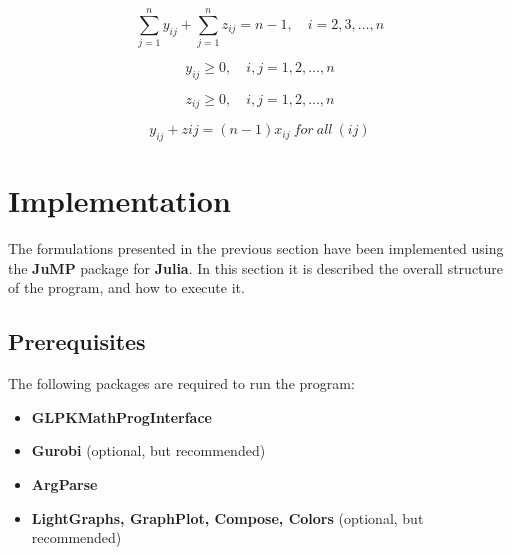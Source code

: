 \documentclass[
12pt,
a4paper,
oneside,
headinclude,
footinclude]{article}
\begin{document}
    \begin{equation}
    {
        \sum_{j=1}^n{y_{ij}} + \sum_{j=1}^n{z_{ij}} = n-1,\quad i=2,3,\ldots,n
    }
    \end{equation}
    
    \begin{equation}
    {
        y_{ij} \geq 0,\quad i,j=1,2,\ldots,n
    }
    \end{equation}
    
    \begin{equation}
    {
        z_{ij} \geq 0,\quad i,j=1,2,\ldots,n
    }
    \end{equation}
    
    \begin{equation}
    {
        y_{ij} + z{ij} = (n-1)x_{ij}\ for\ all\ (ij)
    }
    \end{equation}
    
    
    
    \section{Implementation}
    The formulations presented in the previous section have been implemented using the \textbf{JuMP} package for \textbf{Julia}. In this section it is described the overall structure of the program, and how to execute it.
    
    
    \subsection{\textbf{Prerequisites}}
    The following packages are required to run the program:
    \begin{itemize}
        \item \textbf{GLPKMathProgInterface}
        \item \textbf{Gurobi} (optional, but recommended)
        \item \textbf{ArgParse}
        \item \textbf{LightGraphs, GraphPlot, Compose, Colors} (optional, but recommended)
    \end{itemize}
    
\end{document}
